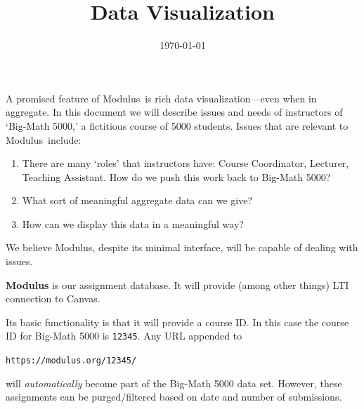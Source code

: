 \documentclass{techbrief}
\title{Data\! Visualization}
\date{\today}
\newcommand{\modulus}{\textsf{Modulus}}
\begin{document}
\pagestyle{main}%
\thispagestyle{title}
\lettrine[lines=2]{A}{} promised feature of \modulus\ is rich data
visualization---even when in
aggregate.
In this document we will describe issues and needs of instructors of `Big-Math
5000,' a fictitious course of 5000 students.
Issues that are relevant to \modulus\ include:
\begin{enumerate}
    \item There are many `roles' that instructors have: Course Coordinator,
          Lecturer, Teaching Assistant. How do we push this work back to
          Big-Math 5000?
    \item What sort of meaningful aggregate data can we give?
    \item How can we display this data in a meaningful way?
\end{enumerate}

We believe \modulus, despite its minimal interface, will be capable of dealing
with issues.

\begin{xframe}{\bfseries \modulus} is our assignment database. It will provide (among other things) LTI connection to Canvas.

    \begin{center}
    \end{center}

    
    Its basic functionality is that it will provide a course ID. In this case the course ID for Big-Math 5000 is \texttt{12345}.
    Any URL appended to
    \begin{center}
        \texttt{https://modulus.org/12345/}
    \end{center}
    will \textit{automatically} become part of the Big-Math 5000 data set. However, these assignments can be purged/filtered based on date and number of submissions. 
\end{xframe}
\end{document}
